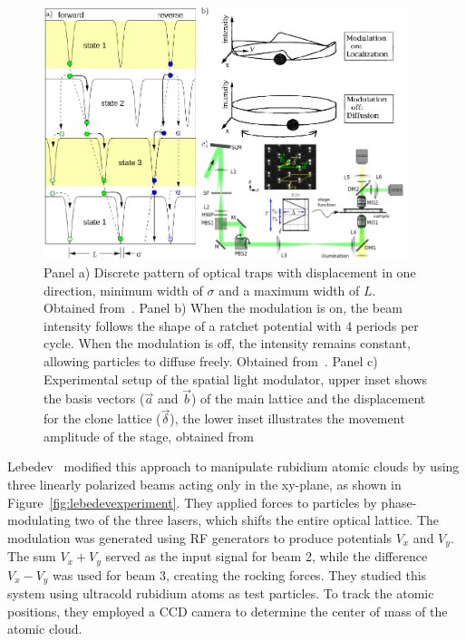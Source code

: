\begin{figure}
  \begin{center}
    \includegraphics[width=0.95\textwidth]{figures/rockingratchets.pdf}
  \end{center}
  \caption[Rocking ratchets expermients.]{Panel a) Discrete pattern of optical traps with displacement in one direction, minimum width of $\sigma$ and a maximum width of $L$. Obtained from~\cite{lee2005observation}. Panel b) When the modulation is on, the beam intensity follows the shape of a ratchet potential with 4 periods per cycle. When the modulation is off, the intensity remains constant, allowing particles to diffuse freely. Obtained from~\cite{faucheux1995optical}. Panel c) Experimental setup of the spatial light modulator, upper inset shows the basis vectors ($\vec{a}$ and $\vec{b}$) of the main lattice and the displacement for the clone lattice ($\vec{\delta}$), the lower inset illustrates the movement amplitude of the stage, obtained from~\cite{arzola2017omnidirectional}}\label{fig:rockingratchets}
\end{figure}

 Lebedev~\cite{lebedev2009two} modified this approach to manipulate rubidium atomic clouds by using three linearly polarized beams acting only in the xy-plane, as shown in Figure~\ref{fig:lebedevexperiment}. They applied forces to particles by phase-modulating two of the three lasers, which shifts the entire optical lattice. The modulation was generated using RF generators to produce potentials $V_x$ and $V_y$. The sum $V_x + V_y$ served as the input signal for beam 2, while the difference $V_x - V_y$ was used for beam 3, creating the rocking forces. They studied this system using ultracold rubidium atoms as test particles. To track the atomic positions, they employed a CCD camera to determine the center of mass of the atomic cloud.

